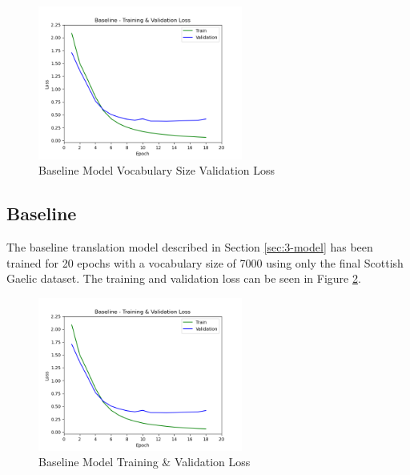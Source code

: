 \begin{figure}[ht!]
\centering
\includegraphics[width=0.6\textwidth]{media/experiments/loss/loss_baseline.png}
\captionsetup{justification=centering}
\caption[Baseline Model Vocabulary Size Validation Loss]{Baseline Model Vocabulary Size Validation Loss}
\label{fig:loss_vocab}
\end{figure}


\subsection{Baseline}
\label{sec:4-baseline}

The baseline translation model described in Section \ref{sec:3-model} has been trained for 20 epochs with a vocabulary size of 7000 using only the final Scottish Gaelic dataset. The training and validation loss can be seen in Figure \ref{fig:loss_baseline}.

\begin{figure}[ht!]
\centering
\includegraphics[width=0.6\textwidth]{media/experiments/loss/loss_baseline.png}
\captionsetup{justification=centering}
\caption[Baseline Model Training \& Validation Loss]{Baseline Model Training \& Validation Loss}
\label{fig:loss_baseline}
\end{figure}


